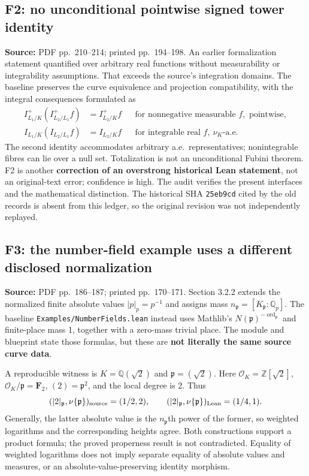 \documentclass[11pt,a4paper]{article}
\newcommand{\Q}{\mathbb Q}
\newcommand{\Z}{\mathbb Z}
\newcommand{\code}[1]{{\small\nolinkurl{#1}}}
\newcommand{\loc}[2]{\par\noindent\textbf{Source:} PDF pp.~#1; printed pp.~#2.}
\begin{document}
\subsection{F2: no unconditional pointwise signed tower identity}
\loc{210--214}{194--198}
An earlier formalization statement quantified over arbitrary real functions without measurability or integrability assumptions. That exceeds the source's integration domains. The baseline preserves the curve equivalence and projection compatibility, with the integral consequences formulated as
\begin{align*}
 I^+_{L_1/K}(I^+_{L_2/L_1}f)&=I^+_{L_2/K}f
 &&\text{for nonnegative measurable }f,\text{ pointwise},\\
 I_{L_1/K}(I_{L_2/L_1}f)&=I_{L_2/K}f
 &&\text{for integrable real }f,\ \nu_K\text{-a.e.}
\end{align*}
The second identity accommodates arbitrary a.e.\ representatives; nonintegrable fibres can lie over a null set. Totalization is not an unconditional Fubini theorem. F2 is another \textbf{correction of an overstrong historical Lean statement}, not an original-text error; confidence is high. The audit verifies the present interfaces and the mathematical distinction. The historical SHA \code{25eb9cd} cited by the old records is absent from this ledger, so the original revision was not independently replayed.

\subsection{F3: the number-field example uses a different disclosed normalization}
\loc{186--187}{170--171}
Section 3.2.2 extends the normalized finite absolute values $|p|_p=p^{-1}$ and assigns mass $n_{\mathfrak p}=[K_{\mathfrak p}:\Q_p]$.
The baseline \code{Examples/NumberFields.lean} instead uses Mathlib's
$N(\mathfrak p)^{-\operatorname{ord}_{\mathfrak p}}$ and finite-place mass 1, together with a zero-mass trivial place. The module and blueprint state those formulas, but these are \textbf{not literally the same source curve data}.

A reproducible witness is $K=\Q(\sqrt2)$ and $\mathfrak p=(\sqrt2)$.
Here $\mathcal O_K=\Z[\sqrt2]$, $\mathcal O_K/\mathfrak p=\mathbf F_2$,
$(2)=\mathfrak p^2$, and the local degree is 2. Thus
\[
 (|2|_{\mathfrak p},\nu\{\mathfrak p\})_{\rm source}=(1/2,2),\qquad
 (|2|_{\mathfrak p},\nu\{\mathfrak p\})_{\rm Lean}=(1/4,1).
\]
Generally, the latter absolute value is the $n_{\mathfrak p}$th power of the former, so weighted logarithms and the corresponding heights agree. Both constructions support a product formula; the proved properness result is not contradicted. Equality of weighted logarithms does not imply separate equality of absolute values and measures, or an absolute-value-preserving identity morphism.
\end{document}
